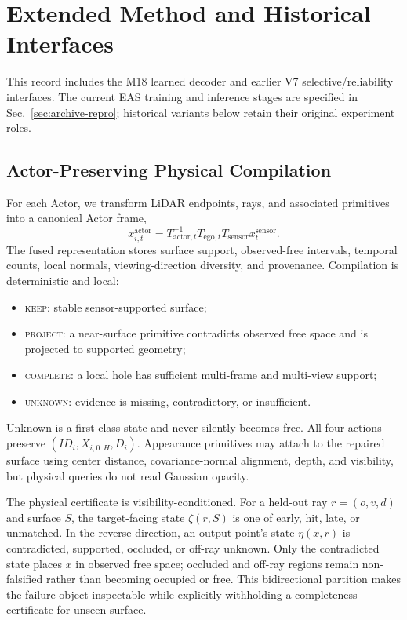\section{Extended Method and Historical Interfaces}

This record includes the M18 learned decoder and earlier V7 selective/reliability interfaces. The current EAS training and inference stages are specified in Sec.~\ref{sec:archive-repro}; historical variants below retain their original experiment roles.

\subsection{Actor-Preserving Physical Compilation}

For each Actor, we transform LiDAR endpoints, rays, and associated primitives into a canonical Actor frame,
\begin{equation}
x_{i,t}^{\mathrm{actor}}=T_{\mathrm{actor},t}^{-1}T_{\mathrm{ego},t}T_{\mathrm{sensor}}x_t^{\mathrm{sensor}}.
\end{equation}
The fused representation stores surface support, observed-free intervals, temporal counts, local normals, viewing-direction diversity, and provenance. Compilation is deterministic and local:
\begin{itemize}
    \item \textsc{keep}: stable sensor-supported surface;
    \item \textsc{project}: a near-surface primitive contradicts observed free space and is projected to supported geometry;
    \item \textsc{complete}: a local hole has sufficient multi-frame and multi-view support;
    \item \textsc{unknown}: evidence is missing, contradictory, or insufficient.
\end{itemize}
Unknown is a first-class state and never silently becomes free. All four actions preserve $(ID_i,X_{i,0:H},D_i)$. Appearance primitives may attach to the repaired surface using center distance, covariance-normal alignment, depth, and visibility, but physical queries do not read Gaussian opacity.

The physical certificate is visibility-conditioned. For a held-out ray $r=(o,v,d)$ and surface $S$, the target-facing state
$\zeta(r,S)$ is one of early, hit, late, or unmatched. In the reverse direction, an output point's state $\eta(x,r)$ is
contradicted, supported, occluded, or off-ray unknown. Only the contradicted state places $x$ in observed free space; occluded and
off-ray regions remain non-falsified rather than becoming occupied or free. This bidirectional partition makes the failure object
inspectable while explicitly withholding a completeness certificate for unseen surface.

